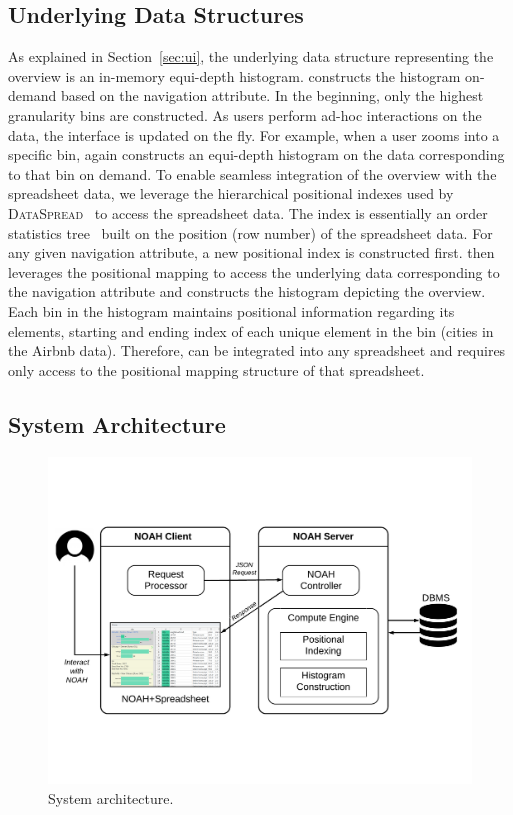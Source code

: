 \subsection*{Underlying Data Structures}
As explained in Section~\ref{sec:ui}, the underlying data structure representing the overview is an in-memory equi-depth histogram. 
\noah constructs the histogram on-demand based on the navigation attribute. 
In the beginning, only the highest granularity bins are constructed. 
As users perform ad-hoc interactions on the data, the interface is updated on the fly. 
For example, when a user zooms into a specific bin, 
\noah again constructs an equi-depth histogram 
on the data corresponding to that bin on demand.
To enable seamless integration of the overview 
with the spreadsheet data, we leverage the hierarchical positional indexes
used by {\scshape DataSpread}~\cite{datamodels} to access
the spreadsheet data. 
The index is essentially an
order statistics tree~\cite{datamodels} 
built on the position (\eg row number) of the spreadsheet data. For any given navigation attribute, a new positional index is constructed first. 
\noah then leverages the positional mapping to access the underlying data corresponding to the navigation attribute and constructs the histogram depicting the overview. 
Each bin in the histogram maintains positional information regarding its elements, \ie starting and ending index of each unique element in the bin (\eg cities in the Airbnb data).  
Therefore, \noah can be integrated into any 
spreadsheet and requires only access to the positional mapping structure of that spreadsheet.

\subsection*{System Architecture}

\begin{figure}
    \centering
    \includegraphics[trim=0 4cm 0 3cm,clip,width=\linewidth]{images/arch.pdf}
   \caption{\noah System architecture.}
   \label{fig:arch}
 \end{figure} 

